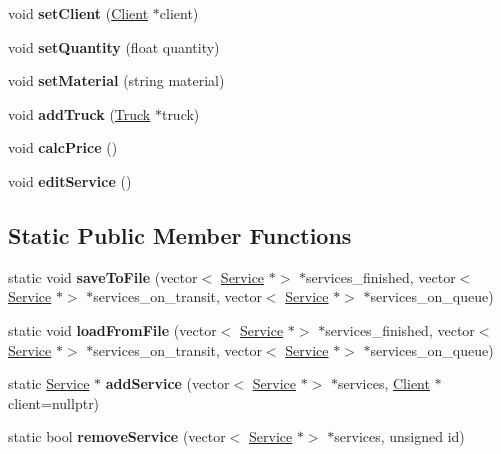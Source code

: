 \begin{DoxyCompactItemize}
void {\bfseries set\+Client} (\hyperlink{class_client}{Client} $\ast$client)
\item 
\mbox{\label{class_service_a29386f4e82e1de1f654468d4a020c6a4}} 
void {\bfseries set\+Quantity} (float quantity)
\item 
\mbox{\label{class_service_a9fcafc3bcbdc0b436860ee5626c69ce1}} 
void {\bfseries set\+Material} (string material)
\item 
\mbox{\label{class_service_aa6203cff9343cb8e7bf996514f14179d}} 
void {\bfseries add\+Truck} (\hyperlink{class_truck}{Truck} $\ast$truck)
\item 
\mbox{\label{class_service_a9efe3e195062d8f668e49be1759d325c}} 
void {\bfseries calc\+Price} ()
\item 
\mbox{\label{class_service_a351a27eebc07d1ff3f433d6ad356925a}} 
void {\bfseries edit\+Service} ()
\end{DoxyCompactItemize}
\subsection*{Static Public Member Functions}
\begin{DoxyCompactItemize}
\item 
\mbox{\label{class_service_ad353882cb821be640bb4627b9a38f030}} 
static void {\bfseries save\+To\+File} (vector$<$ \hyperlink{class_service}{Service} $\ast$$>$ $\ast$services\+\_\+finished, vector$<$ \hyperlink{class_service}{Service} $\ast$$>$ $\ast$services\+\_\+on\+\_\+transit, vector$<$ \hyperlink{class_service}{Service} $\ast$$>$ $\ast$services\+\_\+on\+\_\+queue)
\item 
\mbox{\label{class_service_a494bf949ee67e670ad7d442cf579af22}} 
static void {\bfseries load\+From\+File} (vector$<$ \hyperlink{class_service}{Service} $\ast$$>$ $\ast$services\+\_\+finished, vector$<$ \hyperlink{class_service}{Service} $\ast$$>$ $\ast$services\+\_\+on\+\_\+transit, vector$<$ \hyperlink{class_service}{Service} $\ast$$>$ $\ast$services\+\_\+on\+\_\+queue)
\item 
\mbox{\label{class_service_a9e1aa933d52a23d5e265666bdedea0f1}} 
static \hyperlink{class_service}{Service} $\ast$ {\bfseries add\+Service} (vector$<$ \hyperlink{class_service}{Service} $\ast$$>$ $\ast$services, \hyperlink{class_client}{Client} $\ast$client=nullptr)
\item 
\mbox{\label{class_service_af2ca48ced14708abeb5f92f10245241c}} 
static bool {\bfseries remove\+Service} (vector$<$ \hyperlink{class_service}{Service} $\ast$$>$ $\ast$services, unsigned id)
\end{DoxyCompactItemize}
